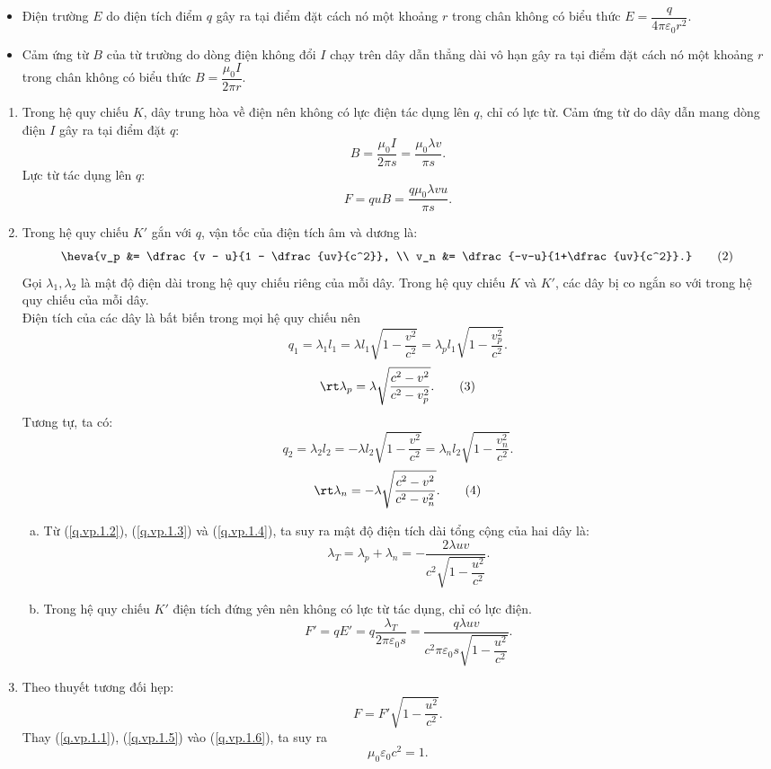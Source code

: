 \begin{vd}
\begin{enumerate}[1.]
\begin{itemize}
        \item Điện trường $E$ do điện tích điểm $q$ gây ra tại điểm đặt cách nó một khoảng $r$ trong chân không có biểu thức $E=\dfrac{q}{4 \pi \varepsilon_{0} r^{2}} .$
        \item Cảm ứng từ $B$ của từ trường do dòng điện không đổi $I$ chạy trên dây dẫn thẳng dài vô hạn gây ra tại điểm đặt cách nó một khoảng $r$ trong chân không có biểu thức $B=\dfrac{\mu_{0} I}{2 \pi r}$.
    \end{itemize}
\end{enumerate}
\end{vd}
\begin{loigiai}
\begin{enumerate}[1)]
    \item Trong hệ quy chiếu $K$, dây trung hòa về điện nên không có lực điện tác dụng lên $q$, chỉ có lực từ. Cảm ứng từ do dây dẫn mang dòng điện $I$ gây ra tại điểm đặt $q$:
    \[B = \dfrac{\mu_0 I}{2\pi s} = \dfrac{\mu_0 \lambda v}{\pi s}.\]
    Lực từ tác dụng lên $q$:
    \[F = quB = \dfrac{q\mu_0 \lambda v u}{\pi s}.\tag{1}\label{q.vp.1.1} \]
    \item Trong hệ quy chiếu $K'$ gắn với $q$, vận tốc của điện tích âm và dương là:
    \[\heva{v_p &= \dfrac{v - u}{1 - \dfrac{uv}{c^2}}, \\ v_n &= \dfrac{-v-u}{1+\dfrac{uv}{c^2}}.} \tag{2}\label{q.vp.1.2}\]
    Gọi $\lambda_1, \lambda_2$ là mật độ điện dài trong hệ quy chiếu riêng của mỗi dây. Trong hệ quy chiếu $K$ và $K'$, các dây bị co ngắn so với trong hệ quy chiếu của mỗi dây.\\
    Điện tích của các dây là bất biến trong mọi hệ quy chiếu nên
    \[q_1 = \lambda_1 l_1  = \lambda l_1 \sqrt{1 - \dfrac{v^2}{c^2}} = \lambda_p l_1 \sqrt{1 - \dfrac{v_p^2}{c^2}}.\]
    \[\rt \lambda_p = \lambda \sqrt{\dfrac{c^2 - v^2 }{c^2 - v_p^2}}. \tag{3}\label{q.vp.1.3}\]
    Tương tự, ta có:
    \[q_2 = \lambda_2 l_2  = -\lambda l_2 \sqrt{1 - \dfrac{v^2}{c^2}} = \lambda_n l_2 \sqrt{1 - \dfrac{v_n^2}{c^2}}.\]
    \[\rt \lambda_n = - \lambda \sqrt{\dfrac{c^2 - v^2}{c^2 - v_n^2}}.\tag{4}\label{q.vp.1.4}\]
    \begin{enumerate}[a)]
        \item  Từ (\ref{q.vp.1.2}), (\ref{q.vp.1.3}) và (\ref{q.vp.1.4}), ta suy ra mật độ điện tích dài tổng cộng của hai dây là:
        \[\lambda_T = \lambda_p + \lambda_n = -\dfrac{2 \lambda {uv}}{{c}^{2} \sqrt{1- \dfrac{{u}^{2}}{{c}^{2}}}}.\]
        \item Trong hệ quy chiếu $K'$ điện tích đứng yên nên không có lực từ tác dụng, chỉ có lực điện.
        \[F' = qE' = q \dfrac{\lambda_T}{2\pi\varepsilon_0 s} = \dfrac{q\lambda uv}{c^2\pi \varepsilon_0 s \sqrt{1 - \dfrac{u^2}{c^2}}}. \tag{5}\label{q.vp.1.5}\]
    \end{enumerate}
   \item Theo thuyết tương đối hẹp:
   \[F = F' \sqrt{1 - \dfrac{u^2}{c^2}}. \tag{6}\label{q.vp.1.6}\]
   Thay (\ref{q.vp.1.1}), (\ref{q.vp.1.5}) vào (\ref{q.vp.1.6}), ta suy ra
   \[\mu_0 \varepsilon_0 c^2 = 1.\]
\end{enumerate}
\end{loigiai}

